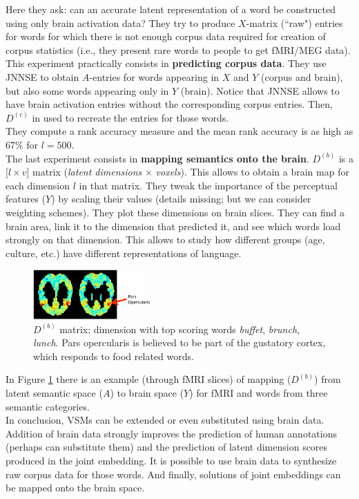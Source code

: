 Here they ask: can an accurate latent representation of a word be constructed using only brain activation data? They try to produce $X$-matrix (``raw") entries for words for which there is not enough corpus data required for creation of corpus statistics (i.e., they present rare words to people to get fMRI/MEG data). This experiment practically consists in \textbf{predicting corpus data}. They use JNNSE to obtain $A$-entries for words appearing in $X$ and $Y$ (corpus and brain), but also some words appearing only in $Y$ (brain). Notice that JNNSE allows to have brain activation entries without the corresponding corpus entries.
Then, $D^{(c)}$ in used to recreate the entries for those words.\\
They compute a rank accuracy measure and the mean rank accuracy is as high as 67\% for $l=500$.\\

The last experiment consists in \textbf{mapping semantics onto the brain}. $D^{(b)}$ is a [$l \times v$] matrix (\textit{latent dimensions} $\times$ \textit{voxels}). This allows to obtain a brain map for each dimension $l$ in that matrix. They tweak the importance of the perceptual features ($Y$) by scaling their values (details missing; but we can consider weighting schemes). They plot these dimensions on brain slices. They can find a brain area, link it to the dimension that predicted it, and see which words load strongly on that dimension. This allows to study how different groups (age, culture, etc.) have different representations of language.

\begin{figure}
  \centering
  \includegraphics[width=0.4\textwidth]{images/jnnse_4.png}
  \caption{$D^{(b)}$ matrix; dimension with top scoring words \textit{buffet}, \textit{brunch}, \textit{lunch}. Pars opercularis is believed to be part of the gustatory cortex, which responds to food related words.}
  \label{fig:jnnse_4}
\end{figure}
In Figure \ref{fig:jnnse_4} there is an example (through fMRI slices) of mapping ($D^{(b)}$) from latent semantic space ($A$) to brain space ($Y$) for fMRI and words from three semantic categories.\\

In conclusion, VSMs can be extended or even substituted using brain data. Addition of brain data strongly improves the prediction of human annotations (perhaps can substitute them) and the prediction of latent dimension scores produced in the joint embedding. It is possible to use brain data to synthesize raw corpus data for those words. And finally, solutions of joint embeddings can be mapped onto the brain space.

